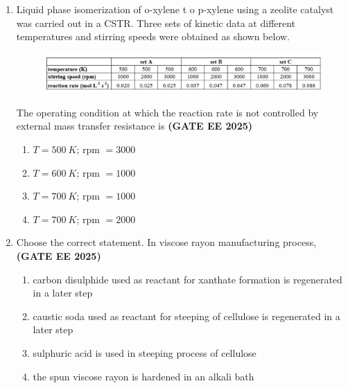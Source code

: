 \documentclass[journal,12pt,onecolumn]{IEEEtran}
\theoremstyle{remark}
\begin{document}
\begin{enumerate}
\begin{enumerate}
\end{enumerate}


\item  Liquid phase isomerization of o-xylene t
	o p-xylene using a zeolite catalyst was carried out in a CSTR. Three sets of kinetic data at different temperatures and stirring speeds were obtained as shown below.
	\begin{figure}
	\begin{center}
\includegraphics[width=1\textwidth]{figs/16.png}
        \caption{}
	\label{fig16}
\end{center}
	\end{figure}
The operating condition at which the reaction rate is not controlled by external mass transfer resistance is
\hfill \textbf{(GATE EE 2025)} \begin{enumerate}
    \item $T=500~K$; rpm $=3000$
    \item $T=600~K$; rpm $=1000$
    \item $T=700~K$; rpm $=1000$
    \item $T=700~K$; rpm $=2000$
\end{enumerate}


\item Choose the correct statement. In viscose rayon manufacturing process,
\hfill \textbf{(GATE EE 2025)} \begin{enumerate}
    \item carbon disulphide used as reactant for xanthate formation is regenerated in a later step
    \item caustic soda used as reactant for steeping of cellulose is regenerated in a later step
    \item sulphuric acid is used in steeping process of cellulose
    \item the spun viscose rayon is hardened in an alkali bath
\end{enumerate}


\end{enumerate}
\end{document}
